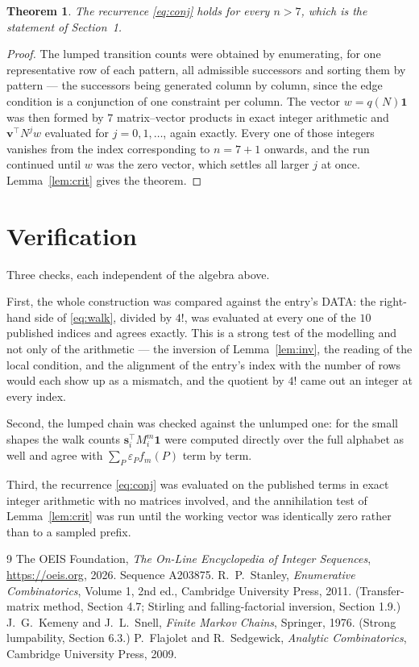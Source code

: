 \documentclass[11pt,a4paper]{article}
\theoremstyle{plain}
\newtheorem{theorem}{Theorem}
\theoremstyle{definition}
\begin{document}
\begin{theorem}
The recurrence \eqref{eq:conj} holds for every $n>7$, which is the statement of
Section~1.
\end{theorem}

\begin{proof}
The lumped transition counts were obtained by enumerating, for one representative row of
each pattern, all admissible successors and sorting them by pattern --- the successors being
generated column by column, since the edge condition is a conjunction of one constraint per
column. The vector $w=q(N)\mathbf{1}$ was then formed by $7$ matrix--vector products
in exact integer arithmetic and $\mathbf{v}^{\!\top}N^{j}w$ evaluated for
$j=0,1,\dots$, again exactly. Every one of those integers vanishes from the index
corresponding to $n=7+1$ onwards, and the run continued until $w$ was the zero vector,
which settles all larger $j$ at once. Lemma~\ref{lem:crit} gives the theorem.
\end{proof}

\section{Verification}

Three checks, each independent of the algebra above.

First, the whole construction was compared against the entry's DATA: the right-hand side of
\eqref{eq:walk}, divided by $4!$, was evaluated at every one of the $10$
published indices and agrees exactly. This is a strong test of the modelling and not only of
the arithmetic --- the inversion of Lemma~\ref{lem:inv}, the reading of the local
condition, and the alignment of the entry's index with the number of rows would each
show up as a mismatch, and the quotient by $4!$ came out an integer at every index.

Second, the lumped chain was checked against the unlumped one: for the small shapes the walk
counts $\mathbf{s}_i^{\!\top}M_i^{m}\mathbf{1}$ were computed directly over the full
alphabet as well and agree with $\sum_P\varepsilon_Pf_m(P)$ term by term.

Third, the recurrence \eqref{eq:conj} was evaluated on the published terms in exact integer
arithmetic with no matrices involved, and the annihilation test of Lemma~\ref{lem:crit} was
run until the working vector was identically zero rather than to a sampled prefix.

\begin{thebibliography}{9}
 The OEIS Foundation, \emph{The On-Line Encyclopedia of Integer
Sequences}, \url{https://oeis.org}, 2026. Sequence A203875.
 R.~P.~Stanley, \emph{Enumerative Combinatorics}, Volume 1, 2nd ed.,
Cambridge University Press, 2011. (Transfer-matrix method, Section 4.7; Stirling and
falling-factorial inversion, Section 1.9.)
 J.~G.~Kemeny and J.~L.~Snell, \emph{Finite Markov Chains}, Springer,
1976. (Strong lumpability, Section 6.3.)
 P.~Flajolet and R.~Sedgewick, \emph{Analytic Combinatorics}, Cambridge
University Press, 2009.
\end{thebibliography}
\end{document}
